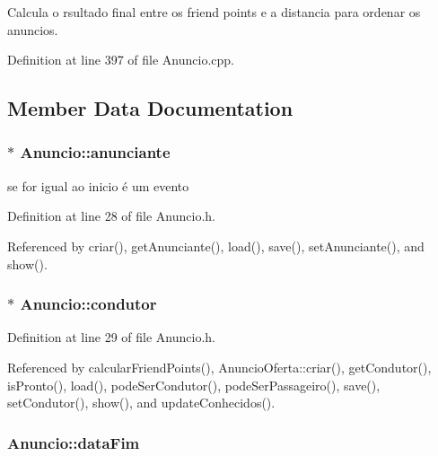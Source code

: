 Calcula o rsultado final entre os friend points e a distancia para ordenar os anuncios. 



Definition at line 397 of file Anuncio.\+cpp.



\subsection{Member Data Documentation}
\hypertarget{class_anuncio_a58250bfc8ab82d4308839b1e26213a0f}{
\subsubsection[{anunciante}]{$\ast$ Anuncio\+::anunciante\hspace{0.3cm}{\ttfamily [protected]}}}\label{class_anuncio_a58250bfc8ab82d4308839b1e26213a0f}


se for igual ao inicio é um evento 



Definition at line 28 of file Anuncio.\+h.



Referenced by criar(), get\+Anunciante(), load(), save(), set\+Anunciante(), and show().

\hypertarget{class_anuncio_a8771818ef0855c6b70e2aca6c89e3177}{
\subsubsection[{condutor}]{$\ast$ Anuncio\+::condutor\hspace{0.3cm}{\ttfamily [protected]}}}\label{class_anuncio_a8771818ef0855c6b70e2aca6c89e3177}


Definition at line 29 of file Anuncio.\+h.



Referenced by calcular\+Friend\+Points(), Anuncio\+Oferta\+::criar(), get\+Condutor(), is\+Pronto(), load(), pode\+Ser\+Condutor(), pode\+Ser\+Passageiro(), save(), set\+Condutor(), show(), and update\+Conhecidos().

\hypertarget{class_anuncio_ac3b9182cc541cb68215f8aa09fb0e11a}{
\subsubsection[{data\+Fim}]{ Anuncio\+::data\+Fim\hspace{0.3cm}{\ttfamily [protected]}}}\label{class_anuncio_ac3b9182cc541cb68215f8aa09fb0e11a}


